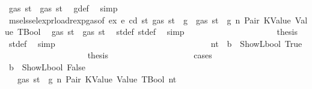 \begin{isabellebody}
\ {\isachardoublequoteopen}gas\ st{}{\isacharprime}{\kern0pt}\ {\isasymle}\ gas\ st{\isacharprime}{\kern0pt}{\isacharprime}{\kern0pt}{\isachardoublequoteclose}\ \isamarkupfalse%
\ g{\isacharunderscore}{\kern0pt}def\ \isamarkupfalse%
\ simp\isanewline
\ \ \ \ \ \ \ \ \ \ \ \ \ \ \ \ \ \ \isamarkupfalse%
\ \isamarkupfalse%
\ msel{\isacharunderscore}{\kern0pt}ssel{\isacharunderscore}{\kern0pt}expr{\isacharunderscore}{\kern0pt}load{\isacharunderscore}{\kern0pt}rexp{\isacharunderscore}{\kern0pt}gas{\isacharparenleft}{\kern0pt}{}{\isacharparenright}{\kern0pt}{\isacharbrackleft}{\kern0pt}of\ ex\ e\ cd\ st{\isacharprime}{\kern0pt}\ {\isachardoublequoteopen}gas\ st\ {\isacharminus}{\kern0pt}\ g{\isachardoublequoteclose}{\isacharbrackright}{\kern0pt}\ {\isacharbackquoteopen}{\isasymnot}\ gas\ st\ {\isasymle}\ g{\isacharbackquoteclose}\ n\ Pair\ KValue\ Value\ TBool\ \isamarkupfalse%
\ {\isachardoublequoteopen}gas\ st{\isacharprime}{\kern0pt}{\isacharprime}{\kern0pt}\ {\isasymle}\ gas\ st{\isacharprime}{\kern0pt}{\isachardoublequoteclose}\ \isamarkupfalse%
\ st{\isacharprime}{\kern0pt}{\isacharunderscore}{\kern0pt}def\ st{\isacharprime}{\kern0pt}{\isacharprime}{\kern0pt}{\isacharunderscore}{\kern0pt}def\ \isamarkupfalse%
\ simp\isanewline
\ \ \ \ \ \ \ \ \ \ \ \ \ \ \ \ \ \ \isamarkupfalse%
\ \isamarkupfalse%
\ {\isacharquery}{\kern0pt}thesis\ \isamarkupfalse%
\ st{\isacharprime}{\kern0pt}{\isacharunderscore}{\kern0pt}def\ \isamarkupfalse%
\ simp\isanewline
\ \ \ \ \ \ \ \ \ \ \ \ \ \ \ \ \isamarkupfalse%
\isanewline
\ \ \ \ \ \ \ \ \ \ \ \ \ \ \ \ \ \ \isamarkupfalse%
\ nt{\isacharcolon}{\kern0pt}\ {\isachardoublequoteopen}{\isasymnot}\ b\ {\isacharequal}{\kern0pt}\ ShowL\isactrlsub b\isactrlsub o\isactrlsub o\isactrlsub l\ True{\isachardoublequoteclose}\isanewline
\ \ \ \ \ \ \ \ \ \ \ \ \ \ \ \ \ \ \isamarkupfalse%
\ {\isacharquery}{\kern0pt}thesis\isanewline
\ \ \ \ \ \ \ \ \ \ \ \ \ \ \ \ \ \ \isamarkupfalse%
\ cases\isanewline
\ \ \ \ \ \ \ \ \ \ \ \ \ \ \ \ \ \ \ \ \isamarkupfalse%
\ {\isachardoublequoteopen}b\ {\isacharequal}{\kern0pt}\ ShowL\isactrlsub b\isactrlsub o\isactrlsub o\isactrlsub l\ False{\isachardoublequoteclose}\isanewline
\ \ \ \ \ \ \ \ \ \ \ \ \ \ \ \ \ \ \ \ \isamarkupfalse%
\ {}{\isacharparenleft}{\kern0pt}{}{\isacharparenright}{\kern0pt}\ {\isacharbackquoteopen}{\isasymnot}\ gas\ st\ {\isasymle}\ g{\isacharbackquoteclose}\ n\ Pair\ KValue\ Value\ TBool\ nt\ \isamarkupfalse%

\end{isabellebody}
